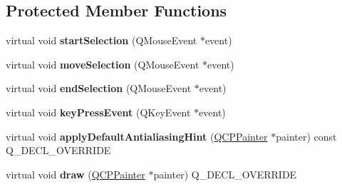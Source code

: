 \subsection*{Protected Member Functions}
\begin{DoxyCompactItemize}
\item 
virtual void {\bfseries start\+Selection} (Q\+Mouse\+Event $\ast$event)\hypertarget{classQCPSelectionRect_a271f24cfca8bc50a0e2b4310ff90e227}{}\label{classQCPSelectionRect_a271f24cfca8bc50a0e2b4310ff90e227}

\item 
virtual void {\bfseries move\+Selection} (Q\+Mouse\+Event $\ast$event)\hypertarget{classQCPSelectionRect_a95c3f1700be2a6d7bba0fe56ece5fbb1}{}\label{classQCPSelectionRect_a95c3f1700be2a6d7bba0fe56ece5fbb1}

\item 
virtual void {\bfseries end\+Selection} (Q\+Mouse\+Event $\ast$event)\hypertarget{classQCPSelectionRect_a625bcffd73987f6de6c6559aaf29ab9d}{}\label{classQCPSelectionRect_a625bcffd73987f6de6c6559aaf29ab9d}

\item 
virtual void {\bfseries key\+Press\+Event} (Q\+Key\+Event $\ast$event)\hypertarget{classQCPSelectionRect_a1affe764316d6122a26fdb2e9583feb1}{}\label{classQCPSelectionRect_a1affe764316d6122a26fdb2e9583feb1}

\item 
virtual void {\bfseries apply\+Default\+Antialiasing\+Hint} (\hyperlink{classQCPPainter}{Q\+C\+P\+Painter} $\ast$painter) const Q\+\_\+\+D\+E\+C\+L\+\_\+\+O\+V\+E\+R\+R\+I\+DE\hypertarget{classQCPSelectionRect_aa854697618e16037ba9c73056abfb9bf}{}\label{classQCPSelectionRect_aa854697618e16037ba9c73056abfb9bf}

\item 
virtual void {\bfseries draw} (\hyperlink{classQCPPainter}{Q\+C\+P\+Painter} $\ast$painter) Q\+\_\+\+D\+E\+C\+L\+\_\+\+O\+V\+E\+R\+R\+I\+DE\hypertarget{classQCPSelectionRect_ab0e50ae796508bdcd97ab8c335c593bf}{}\label{classQCPSelectionRect_ab0e50ae796508bdcd97ab8c335c593bf}

\end{DoxyCompactItemize}
